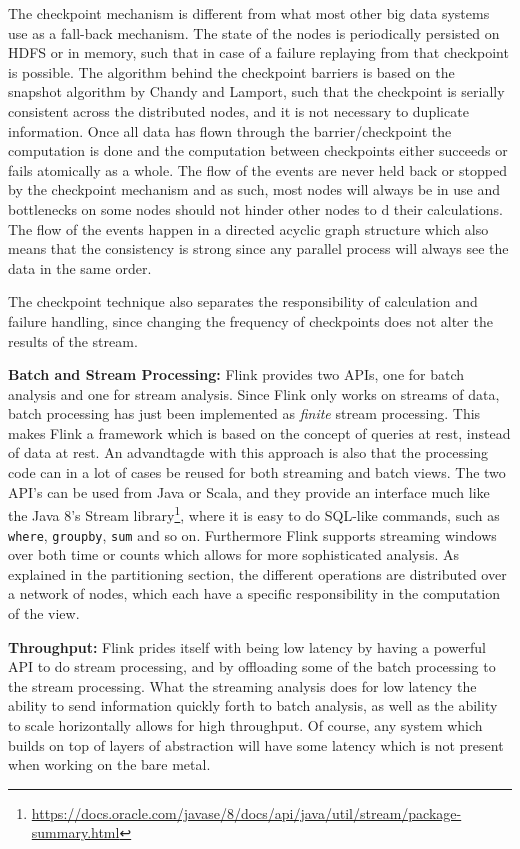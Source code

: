 The checkpoint mechanism is different from what most other big data systems use as a fall-back mechanism. The state of the nodes is periodically persisted on HDFS or in memory, such that in case of a failure replaying from that checkpoint is possible. The algorithm behind the checkpoint barriers is based on the snapshot algorithm by Chandy and Lamport\cite{data-artisan-flink}, such that the checkpoint is serially consistent across the distributed nodes, and it is not necessary to duplicate information. Once all data has flown through the barrier/checkpoint the computation is done and the computation between checkpoints either succeeds or fails atomically as a whole. The flow of the events are never held back or stopped by the checkpoint mechanism and as such, most nodes will always be in use and bottlenecks on some nodes should not hinder other nodes to d their calculations. The flow of the events happen in a directed acyclic graph structure which also means that the consistency is strong since any parallel process will always see the data in the same order\cite{data-artisan-flink}.

The checkpoint technique also separates the responsibility of calculation and failure handling, since changing the frequency of checkpoints does not alter the results of the stream.

\newpar \textbf{Batch and Stream Processing:} Flink provides two APIs, one for batch analysis and one for stream analysis. Since Flink only works on streams of data, batch processing has just been implemented as \textit{finite} stream processing. This makes Flink a framework which is based on the concept of queries at rest, instead of data at rest. An advandtagde with this approach is also that the processing code can in a lot of cases be reused for both streaming and batch views. The two API's can be used from Java or Scala, and they provide an interface much like the Java 8's Stream library\footnote{ \url{https://docs.oracle.com/javase/8/docs/api/java/util/stream/package-summary.html}}, where it is easy to do SQL-like commands, such as \texttt{where}, \texttt{groupby}, \texttt{sum} and so on. Furthermore Flink supports streaming windows over both time or counts which allows for more sophisticated analysis. As explained in the partitioning section, the different operations are distributed over a network of nodes, which each have a specific responsibility in the computation of the view.

\newpar \textbf{Throughput:} Flink prides itself with being low latency by having a powerful API to do stream processing, and by offloading some of the batch processing to the stream processing. What the streaming analysis does for low latency the ability to send information quickly forth to batch analysis, as well as the ability to scale horizontally allows for high throughput. Of course, any system which builds on top of layers of abstraction will have some latency which is not present when working on the bare metal.

